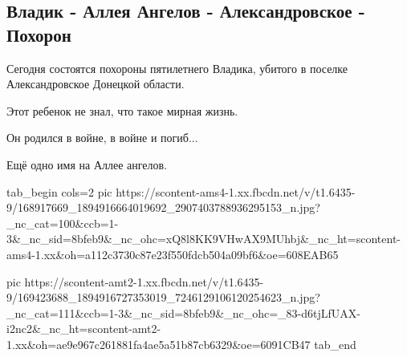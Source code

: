  
 
 
 
 

\subsection{Владик - Аллея Ангелов - Александровское - Похорон}
\label{sec:05_04_2021.fb.larin_artem.1.pohoron_vladik}

Сегодня состоятся похороны пятилетнего Владика, убитого в поселке Александровское Донецкой области.

Этот ребенок не знал, что такое мирная жизнь. 

Он родился в войне, в войне и погиб...

Ещё одно имя на Аллее ангелов.

\ifcmt
  tab_begin cols=2
    pic https://scontent-ams4-1.xx.fbcdn.net/v/t1.6435-9/168917669_1894916664019692_2907403788936295153_n.jpg?_nc_cat=100&ccb=1-3&_nc_sid=8bfeb9&_nc_ohc=xQ8l8KK9VHwAX9MUhbj&_nc_ht=scontent-ams4-1.xx&oh=a112c3730c87e23f550fdcb504a09bf6&oe=608EAB65

    pic https://scontent-amt2-1.xx.fbcdn.net/v/t1.6435-9/169423688_1894916727353019_7246129106120254623_n.jpg?_nc_cat=111&ccb=1-3&_nc_sid=8bfeb9&_nc_ohc=_83-d6tjLfUAX-i2nc2&_nc_ht=scontent-amt2-1.xx&oh=ae9e967c261881fa4ae5a51b87cb6329&oe=6091CB47
  tab_end
\fi

